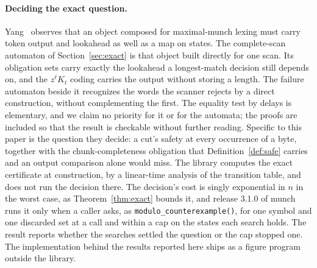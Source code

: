 \documentclass[11pt,a4paper]{article}
\theoremstyle{definition}
\theoremstyle{plain}
\newcommand{\code}[1]{\texttt{#1}}
\begin{document}
\paragraph{Deciding the exact question.} Yang~\cite{yang1996mealy} observes that an object composed for maximal-munch
lexing must carry token output and lookahead as well as a map on states. The complete-scan automaton of
Section~\ref{sec:exact} is that object built directly for one scan. Its obligation sets carry exactly the lookahead a
longest-match decision still depends on, and the $z^\ell K_t$ coding carries the output without storing a length. The
failure automaton beside it recognizes the words the scanner rejects by a direct construction, without complementing the
first. The equality test by delays is elementary, and we claim no priority for it or for the automata; the proofs are
included so that the result is checkable without further reading. Specific to this paper is the question they decide: a
cut's safety at every occurrence of a byte, together with the chunk-completeness obligation that
Definition~\ref{def:safe} carries and an output comparison alone would miss. The library computes the exact certificate
at construction, by a linear-time analysis of the transition table, and does not run the decision there. The decision's
cost is singly exponential in $n$ in the worst case, as Theorem~\ref{thm:exact} bounds it, and release 3.1.0 of
munch~\cite{munch310} runs it only when a caller asks, as \code{modulo\_counterexample()}, for one symbol and one
discarded set at a call and within a cap on the states each search holds. The result reports whether the searches
settled the question or the cap stopped one. The implementation behind the results reported here ships as a figure
program outside the library.
\end{document}
